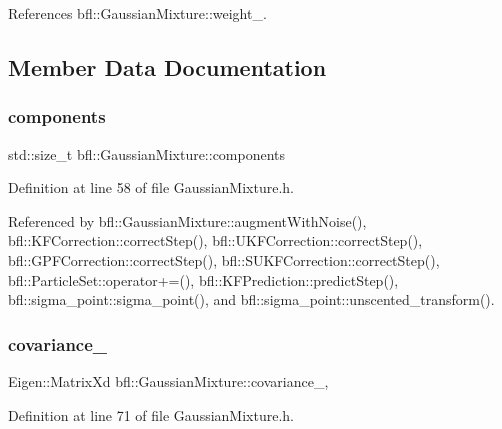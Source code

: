 References bfl\+::\+Gaussian\+Mixture\+::weight\+\_\+.



\subsection{Member Data Documentation}
\mbox{\label{classbfl_1_1GaussianMixture_a02cc284327dbaa6b90c653dd2faccf88}} 
\subsubsection{\texorpdfstring{components}{components}}
{\footnotesize\ttfamily std\+::size\+\_\+t bfl\+::\+Gaussian\+Mixture\+::components\hspace{0.3cm}{\ttfamily [inherited]}}



Definition at line 58 of file Gaussian\+Mixture.\+h.



Referenced by bfl\+::\+Gaussian\+Mixture\+::augment\+With\+Noise(), bfl\+::\+K\+F\+Correction\+::correct\+Step(), bfl\+::\+U\+K\+F\+Correction\+::correct\+Step(), bfl\+::\+G\+P\+F\+Correction\+::correct\+Step(), bfl\+::\+S\+U\+K\+F\+Correction\+::correct\+Step(), bfl\+::\+Particle\+Set\+::operator+=(), bfl\+::\+K\+F\+Prediction\+::predict\+Step(), bfl\+::sigma\+\_\+point\+::sigma\+\_\+point(), and bfl\+::sigma\+\_\+point\+::unscented\+\_\+transform().

\mbox{\label{classbfl_1_1GaussianMixture_aab086cc1a89a8b7efd15303853e52920}} 
\subsubsection{\texorpdfstring{covariance\+\_\+}{covariance\_}}
{\footnotesize\ttfamily Eigen\+::\+Matrix\+Xd bfl\+::\+Gaussian\+Mixture\+::covariance\+\_\+\hspace{0.3cm}{\ttfamily [protected]}, {\ttfamily [inherited]}}



Definition at line 71 of file Gaussian\+Mixture.\+h.



